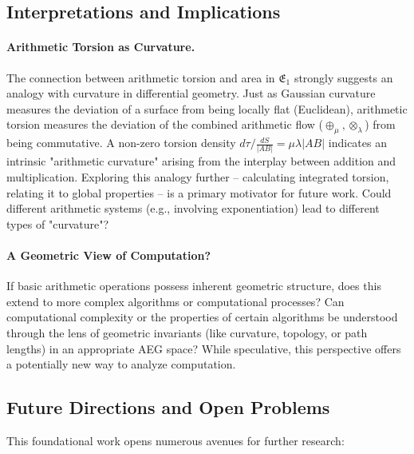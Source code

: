 \documentclass[12pt]{article}
\begin{document}
\subsection{Interpretations and Implications}

\paragraph{Arithmetic Torsion as Curvature.} The connection between arithmetic torsion and area in \( \mathfrak{E}_1 \) strongly suggests an analogy with curvature in differential geometry. Just as Gaussian curvature measures the deviation of a surface from being locally flat (Euclidean), arithmetic torsion measures the deviation of the combined arithmetic flow (\(\oplus_\mu, \otimes_\lambda\)) from being commutative. A non-zero torsion density \( d\tau/\frac{dS}{|AB|} = \mu \lambda |AB| \) indicates an intrinsic "arithmetic curvature" arising from the interplay between addition and multiplication. Exploring this analogy further – calculating integrated torsion, relating it to global properties – is a primary motivator for future work. Could different arithmetic systems (e.g., involving exponentiation) lead to different types of "curvature"?

\paragraph{A Geometric View of Computation?} If basic arithmetic operations possess inherent geometric structure, does this extend to more complex algorithms or computational processes? Can computational complexity or the properties of certain algorithms be understood through the lens of geometric invariants (like curvature, topology, or path lengths) in an appropriate AEG space? While speculative, this perspective offers a potentially new way to analyze computation.

\subsection{Future Directions and Open Problems}

This foundational work opens numerous avenues for further research:
\end{document}
